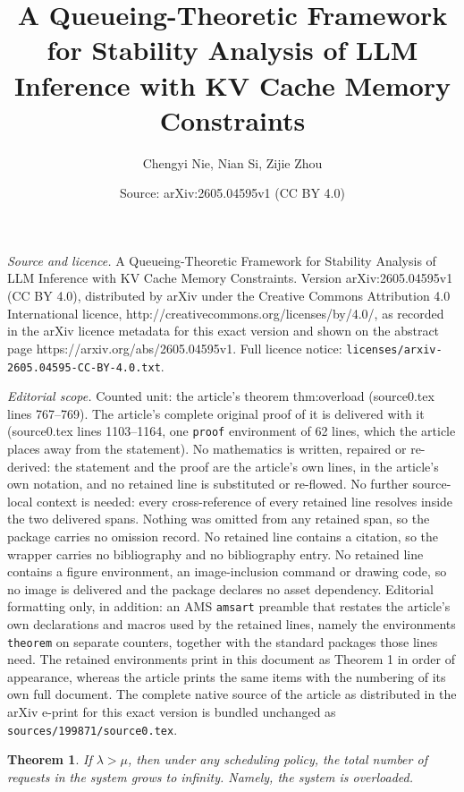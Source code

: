 \documentclass[10pt,a4paper]{amsart}
\title{A Queueing-Theoretic Framework for Stability Analysis of LLM Inference with KV Cache Memory Constraints}
\author{Chengyi Nie, Nian Si, Zijie Zhou}
\date{Source: arXiv:2605.04595v1 (CC BY 4.0)}
\newtheorem{theorem}{Theorem}
\begin{document}
\maketitle

\noindent\emph{Source and licence.} A Queueing-Theoretic Framework for Stability Analysis of LLM Inference with KV Cache Memory Constraints. Version arXiv:2605.04595v1 (CC BY 4.0), distributed by arXiv under the Creative Commons Attribution 4.0 International licence, http://creativecommons.org/licenses/by/4.0/, as recorded in the arXiv licence metadata for this exact version and shown on the abstract page https://arxiv.org/abs/2605.04595v1. Full licence notice: \texttt{licenses/arxiv-2605.04595-CC-BY-4.0.txt}.\par\smallskip

\noindent\textit{Editorial scope.} Counted unit: the article's theorem thm:overload (source0.tex lines 767--769). The article's complete original proof of it is delivered with it (source0.tex lines 1103--1164, one \texttt{proof} environment of 62 lines, which the article places away from the statement). No mathematics is written, repaired or re-derived: the statement and the proof are the article's own lines, in the article's own notation, and no retained line is substituted or re-flowed.  No further source-local context is needed: every cross-reference of every retained line resolves inside the two delivered spans.  Nothing was omitted from any retained span, so the package carries no omission record.  No retained line contains a citation, so the wrapper carries no bibliography and no bibliography entry.  No retained line contains a figure environment, an image-inclusion command or drawing code, so no image is delivered and the package declares no asset dependency.  Editorial formatting only, in addition: an AMS \texttt{amsart} preamble that restates the article's own declarations and macros used by the retained lines, namely the environments \texttt{theorem} on separate counters, together with the standard packages those lines need.  The retained environments print in this document as Theorem 1 in order of appearance, whereas the article prints the same items with the numbering of its own full document.  The complete native source of the article as distributed in the arXiv e-print for this exact version is bundled unchanged as \texttt{sources/199871/source0.tex}.
\begin{theorem} \label{thm:overload}
    If $\lambda > \mu$, then under any scheduling policy, the total number of requests in the system grows to infinity. Namely, the system is overloaded.
\end{theorem}
\end{document}
